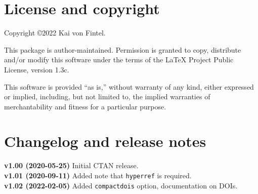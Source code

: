 \documentclass[
]{article}
\begin{document}
\hypertarget{license-and-copyright}{%
\section{License and copyright}\label{license-and-copyright}}

Copyright ©2022 Kai von Fintel.

This package is author-maintained. Permission is granted to copy,
distribute and/or modify this software under the terms of the LaTeX
Project Public License, version 1.3c.

This software is provided ``as is,'' without warranty of any kind,
either expressed or implied, including, but not limited to, the implied
warranties of merchantability and fitness for a particular purpose.

\hypertarget{changelog-and-release-notes}{%
\section{Changelog and release
notes}\label{changelog-and-release-notes}}

\textbf{v1.00 (2020-05-25)} Initial CTAN release.\\
\textbf{v1.01 (2020-09-11)} Added note that \texttt{hyperref} is
required.\\
\textbf{v1.02 (2022-02-05)} Added \texttt{compactdois} option,
documentation on DOIs.
\end{document}
